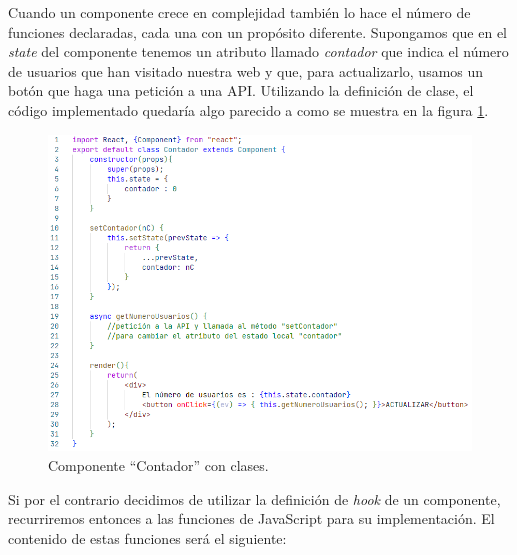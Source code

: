 \documentclass[../main.tex]{subfiles}
\begin{document}
    Cuando un componente crece en complejidad también lo hace el número de funciones declaradas, cada una con un propósito diferente. Supongamos que en el \textit{state} del componente tenemos un atributo llamado \textit{contador} que indica el número de usuarios que han visitado nuestra web y que, para actualizarlo, usamos un botón que haga una petición a una API. Utilizando la definición de clase, el código implementado quedaría algo parecido a como se muestra en la figura \ref{fig::estructura_contador_clase}. \\

    \begin{figure}[!h]
        \centering
        \includegraphics[width=\textwidth]{images/componente_estructura_clase.PNG}
        \caption{Componente ``Contador'' con clases.}
        \label{fig::estructura_contador_clase}
    \end{figure}
    
    Si por el contrario decidimos de utilizar la definición de \textit{hook} de un componente, recurriremos entonces a las funciones de JavaScript para su implementación. El contenido de estas funciones será el siguiente: 
    
\end{document}
